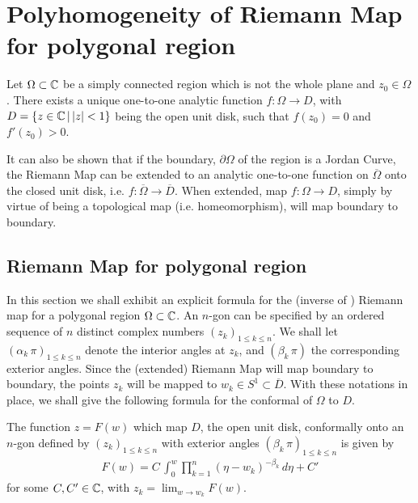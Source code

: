 \documentclass{article}
\begin{document}
\section{Polyhomogeneity of Riemann Map for polygonal region} 

\begin{theorem}
Let $\Omega \subset \mathbb C$ be a simply connected region which is not the whole plane and $z_0 \in \Omega$. There exists a unique one-to-one analytic function $f: \Omega \to D$, with $D = \{z \in \mathbb C \, |\, |z| < 1\}$ being the open unit disk, such that $f(z_0) = 0$ and $f'(z_0) > 0$. 
\end{theorem}

It can also be shown that if the boundary, $\partial \Omega$ of the region is a Jordan Curve, the Riemann Map can be extended to an analytic one-to-one function on $\overline{\Omega}$ onto the closed unit disk, i.e. $f: \overline{\Omega} \to \overline{D}$. When extended, map $f: \Omega \to D$, simply by virtue of being a topological map (i.e. homeomorphism), will map boundary to boundary. 


\subsection{Riemann Map for polygonal region}
In this section we shall exhibit an explicit formula for the (inverse of ) Riemann map for a polygonal region $\Omega \subset \mathbb C$. An $n$-gon can be specified by an ordered sequence of $n$ distinct complex numbers $(z_k)_{1 \leq k \leq n}$. We shall let $(\alpha_k \, \pi)_{1 \leq k \leq n}$ denote the interior angles at $z_k$, and $(\beta_k \, \pi)$ the corresponding exterior angles. Since the (extended) Riemann Map will map boundary to boundary, the points $z_k$ will be mapped to $w_k \in S^1 \subset \overline{D}$. With these notations in place, we shall give the following formula for the conformal of $\Omega$ to $D$. 
\begin{theorem}
The function $ z = F(w)$ which map $D$, the open unit disk, conformally onto an $n$-gon defined by  $(z_k)_{1 \leq k \leq n}$ with exterior angles $(\beta_k \, \pi)_{1 \leq k \leq n}$ is given by 
\begin{align} \label{eq: schwarz-christoffel formula}
F(w) = C \, \int_0^w \prod_{k = 1}^n (\eta - w_k)^{- \beta_k} \, d\eta + C'
\end{align}
for some $C, C' \in \mathbb C$, with $z_k = \lim_{w \to w_k} F(w)$. 
\end{theorem}
\end{document}

